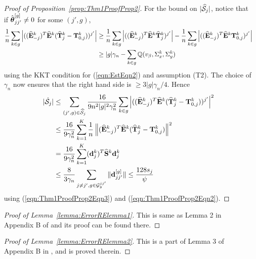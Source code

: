 \begin{proof}[Proof of Proposition~\ref{prop:Thm1ProofProp2}]
For the bound on $| \widehat {{\cal{S}}}_j|$, notice that if $\hat {{\boldsymbol{\theta}}}_{jj'}^{[g]} \neq 0$ for some $(j',g)$,
%
\begin{align*}
\frac{1}{n} \sum_{k \in g} \left| ((\widehat {{\mathbf{E}}}_{-j}^k)^T \widehat {{\mathbf{E}}}^k ( \widehat {{\mathbf{T}}}_j^k - {\mathbf{T}}_{0,j}^k ))^{j'} \right| & \geq
\frac{1}{n} \sum_{k \in g} \left| ((\widehat {{\mathbf{E}}}_{-j}^k)^T \widehat {{\mathbf{E}}}^k \widehat {{\mathbf{T}}}_j^k )^{j'} \right| - \frac{1}{n} \sum_{k \in g} \left| ((\widehat {{\mathbf{E}}}_{-j}^k)^T \widehat {{\mathbf{E}}}^k {\mathbf{T}}_{0,j}^k )^{j'} \right|\\
& \geq |g| \gamma_n - \sum_{k \in g} {\mathbb{Q}} ( v_\beta, \Sigma_x^k, \Sigma_y^k )
\end{align*}
%
using the KKT condition for (\ref{eqn:EstEqn2}) and assumption (T2). The choice of $\gamma_n$ now ensures that the right hand side is $\geq 3|g| \gamma_n / 4$. Hence
%
\begin{align*}
| \hat {{\cal{S}}}_j| & \leq \sum_{(j',g) \in \widehat {{\cal{S}}}_j} \frac{16}{9 n^2 |g|^2 \gamma_n^2 } \sum_{k \in g} \left| ((\widehat {{\mathbf{E}}}_{-j}^k)^T \widehat {{\mathbf{E}}}^k ( \widehat {{\mathbf{T}}}_j^k - {\mathbf{T}}_{0,j}^k ))^{j'} \right|^2\\
& \leq \frac{16}{9 \gamma_n^2} \sum_{k=1}^K \frac{1}{n} \left\| (\widehat {{\mathbf{E}}}_{-j}^k)^T \widehat {{\mathbf{E}}}^k ( \widehat {{\mathbf{T}}}_j^k - {\mathbf{T}}_{0,j}^k ) \right\|^2 \\
& = \frac{16}{9 \gamma_n^2} \sum_{k=1}^K ({\bf{d}}_j^k)^T \widehat {{\mathbf{S}}}^k {\bf{d}}_j^k \\
& \leq \frac{8}{3 \gamma_n} \sum_{j \neq j', g \in {\cal{G}}_y^{jj'}} \| {\bf{d}}_{jj'}^{[g]} \| \leq \frac{128 s_j}{\psi} 
\end{align*}
%
using (\ref{eqn:Thm1ProofProp2Eqn3}) and (\ref{eqn:Thm1ProofProp2Eqn2}).
\end{proof}

\begin{proof}[Proof of Lemma~\ref{lemma:ErrorRElemma1}]
This is same as Lemma 2 in Appendix B of \cite{LinEtal16} and its proof can be found there.
\end{proof}

\begin{proof}[Proof of Lemma~\ref{lemma:ErrorRElemma2}]
This is a part of Lemma 3 of Appendix B in \cite{LinEtal16}, and is proved therein. 
\end{proof}

